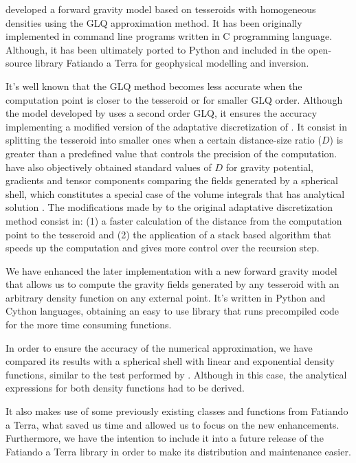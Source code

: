 \documentclass[extra]{gji}
\begin{document}
\citet{Uieda2016} developed a forward gravity model based on tesseroids with homogeneous densities using the GLQ approximation method.
It has been originally implemented in command line programs written in C programming language. Although, it has been ultimately ported to Python and included in the open-source library Fatiando a Terra \citep{Uieda2013} for geophysical modelling and inversion.

It's well known that the GLQ method becomes less accurate when the computation point is closer to the tesseroid \citep{Ku1977} or for smaller GLQ order. 
Although the model developed by \citet{Uieda2016} uses a second order GLQ, it ensures the accuracy implementing a modified version of the adaptative discretization of \citet{Li2011}.
It consist in splitting the tesseroid into smaller ones when a certain distance-size ratio ($D$) is greater than a predefined value that controls the precision of the computation.  \citet{Uieda2016} have also objectively obtained standard values of $D$ for gravity potential, gradients and tensor components comparing the fields generated by a spherical shell, which constitutes a special case of the volume integrals that has analytical solution \citep{LaFehr1991, Mikuska2006, Grombein2013}.
The modifications made by \citet{Uieda2016} to the original adaptative discretization method \citep{Li2011} consist in:
(1) a faster calculation of the distance from the computation point to the tesseroid and 
(2) the application of a stack based algorithm that speeds up the computation and gives more control over the recursion step.

We have enhanced the later implementation with a new forward gravity model that allows us to compute the gravity fields generated by any tesseroid with an arbitrary density function on any external point.
It's written in Python and Cython languages, obtaining an easy to use library that runs precompiled code for the more time consuming functions.

In order to ensure the accuracy of the numerical approximation, we have compared its results with a spherical shell with linear and exponential density functions, similar to the test performed by \cite{Uieda2016}. Although in this case, the analytical expressions for both density functions had to be derived.

It also makes use of some previously existing classes and functions from Fatiando a Terra, what saved us time and allowed us to focus on the new enhancements. Furthermore, we have the intention to include it into a future release of the Fatiando a Terra library in order to make its distribution and maintenance easier.
\end{document}
